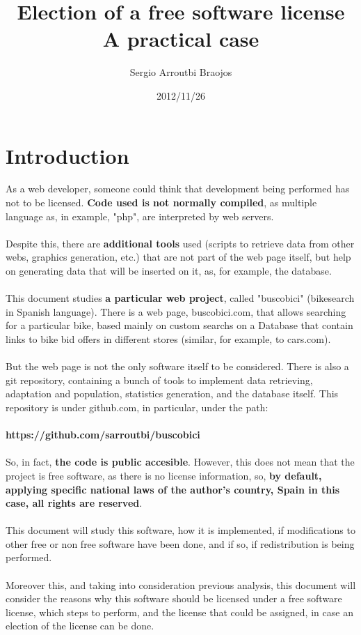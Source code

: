 \documentclass[11pt]{article}
\title{\textbf{Election of a free software license\\ A practical case}}
\author{Sergio Arroutbi Braojos}
\date{2012/11/26}
\begin{document}
\maketitle
\section{Introduction}

As a web developer, someone could think that development being performed has not to be licensed. \textbf{Code used is not normally compiled}, as multiple language as, in example, "php", are interpreted by web servers. \\
\\
Despite this, there are \textbf{additional tools} used (scripts to retrieve data from other webs, graphics generation, etc.) that are not part of the web page itself, but help on generating data that will be inserted on it, as, for example, the database. \\
\\
This document studies \textbf{a particular web project}, called "buscobici" (bikesearch in Spanish language). There is a web page, buscobici.com, that allows searching for a particular bike, based mainly on custom searchs on a Database that contain links to bike bid offers in different stores (similar, for example, to cars.com). \\
\\
But the web page is not the only software itself to be considered. There is also a git repository, containing a bunch of tools to implement data retrieving, adaptation and population, statistics generation, and the database itself. This repository is under github.com, in particular, under the path: \\
\\
\textbf{https://github.com/sarroutbi/buscobici \\}
\\
So, in fact, \textbf{the code is public accesible}. However, this does not mean that the project is free software, as there is no license information, so, \textbf{by default, applying specific national laws of the author's country, Spain in this case, all rights are reserved}. \\
\\
This document will study this software, how it is implemented, if modifications to other free or non free software have been done, and if so, if redistribution is being performed.\\
\\
Moreover this, and taking into consideration previous analysis, this document will consider the reasons why this software should be licensed under a free software license, which steps to perform, and the license that could be assigned, in case an election of the license can be done. 
\end{document}
